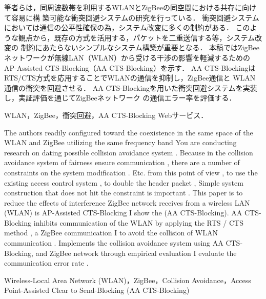 \documentclass[technicalreport]{ieicej}
\begin{document}
\begin{jabstract}
 筆者らは，同周波数帯を利用するWLANとZigBeeの同空間における共存に向けて容易に構
 築可能な衝突回避システムの研究を行っている．
 衝突回避システムにおいては通信の公平性確保の為，システム改変に多くの制約がある．
 このような観点から，既存の方式を活用する，パケットを二重送信する等，システム改変の
 制約にあたらないシンプルなシステム構築が重要となる．
 本稿ではZigBeeネットワークが無線LAN（WLAN）から受ける干渉の影響を軽減するための
 AP-Assisted CTS-Blocking（AA CTS-Blocking）を示す．
 AA CTS-BlockingはRTS/CTS方式を応用することでWLANの通信を抑制し，ZigBee通信と
 WLAN通信の衝突を回避させる．
 AA CTS-Blockingを用いた衝突回避システムを実装し，実証評価を通じてZigBeeネットワーク
 の通信エラー率を評価する．
\end{jabstract}

\begin{jkeyword}
 WLAN，ZigBee，衝突回避，AA CTS-Blocking
 Webサービス．
\end{jkeyword}

\begin{eabstract}
 The authors readily configured toward the coexistence in the same space of the WLAN and ZigBee utilizing the same frequency band
 You are conducting research on dating possible collision avoidance system .
 Because in the collision avoidance system of fairness ensure communication , there are a number of constraints on the system modification .
 Etc. from this point of view , to use the existing access control system , to double the header packet ,
 Simple system construction that does not hit the constraint is important .
 This paper is to reduce the effects of interference ZigBee network receives from a wireless LAN (WLAN) is
 AP-Assisted CTS-Blocking I show the (AA CTS-Blocking).
 AA CTS-Blocking inhibits communication of the WLAN by applying the RTS / CTS method , a ZigBee communication
 I to avoid the collision of WLAN communication .
 Implements the collision avoidance system using AA CTS-Blocking, and ZigBee network through empirical evaluation
 I evaluate the communication error rate .
\end{eabstract}

\begin{ekeyword}
 Wireless-Local Area Network (WLAN)，ZigBee，Collision Avoidance，Access Point-Assisted 
 Clear to Send-Blocking (AA CTS-Blocking)
\end{ekeyword}
\end{document}

